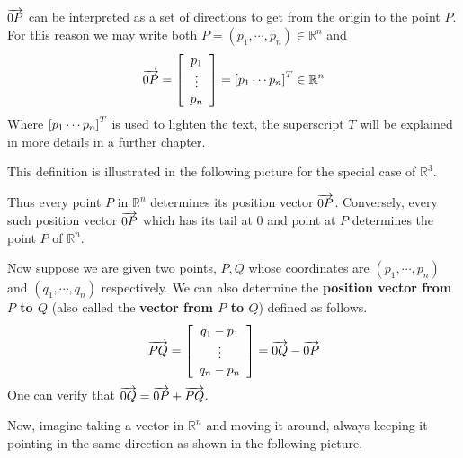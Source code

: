 $\overrightarrow{0P}$ can be interpreted as a set of directions to get from the origin to the point $P$.
For this reason we may write both $P=\left( p_{1},\cdots ,p_{n}\right)  \in \mathbb{R}^{n}$
and  $$\overrightarrow{0P}= \left[ 
\begin{array}{c}
p_{1} \\
\vdots \\
p_{n}
\end{array} \right] = \left[ p_{1} \cdots p_{n} \right]^T \in \mathbb{R}^{n}$$ 
Where $\left[ p_{1} \cdots p_{n} \right]^T$ is used to lighten the text, the superscript $T$ will be explained in more details in a further chapter.

This definition is illustrated in the following picture for the
special case of $\mathbb{R}^{3}$.

\begin{center}
\end{center}

Thus every point $P$ in $\mathbb{R}^{n}$ determines its position
vector $\overrightarrow{0P}$. Conversely, every such position vector $\overrightarrow{0P}$
which has its tail at $0$ and point at $P$ determines the point $P$ of
$\mathbb{R}^{n}$.

Now suppose we are given two points, $P,Q$ whose
coordinates are $\left( p_{1},\cdots ,p_{n}\right) $ and $\left(
q_{1},\cdots ,q_{n}\right) $ respectively. We can also determine the
\textbf{position vector from $P$ to $Q$} (also called the \textbf{vector from $P$ to $Q$}) defined as follows.
\begin{equation*}
\overrightarrow{PQ} = \left[ \begin{array}{c}
q_{1}-p_{1}\\
 \vdots \\
q_{n}-p_{n}
\end{array}
\right] = \overrightarrow{0Q} - \overrightarrow{0P}
\end{equation*}
One can verify that $\overrightarrow{0Q}=\overrightarrow{0P}+\overrightarrow{PQ}$.

Now, imagine taking a vector in $\mathbb{R}^n$ and moving it around, always
keeping it pointing in the same direction as shown in the following picture.

